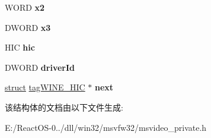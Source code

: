 \begin{DoxyCompactItemize}
W\+O\+RD {\bfseries x2}
\item 
\mbox{\label{structtag_w_i_n_e___h_i_c_a9eb445f0b3347373ef803a22189d3873}} 
D\+W\+O\+RD {\bfseries x3}
\item 
\mbox{\label{structtag_w_i_n_e___h_i_c_a3b6ef3f6f7b054666635c18722f2fd23}} 
H\+IC {\bfseries hic}
\item 
\mbox{\label{structtag_w_i_n_e___h_i_c_abd7471768076fe8dfd321b8b0a134cda}} 
D\+W\+O\+RD {\bfseries driver\+Id}
\item 
\mbox{\label{structtag_w_i_n_e___h_i_c_a7d3312335e8c13b11c40020247f702b3}} 
\hyperlink{interfacestruct}{struct} \hyperlink{structtag_w_i_n_e___h_i_c}{tag\+W\+I\+N\+E\+\_\+\+H\+IC} $\ast$ {\bfseries next}
\end{DoxyCompactItemize}


该结构体的文档由以下文件生成\+:\begin{DoxyCompactItemize}
\item 
E\+:/\+React\+O\+S-\/0../dll/win32/msvfw32/msvideo\+\_\+private.\+h\end{DoxyCompactItemize}

